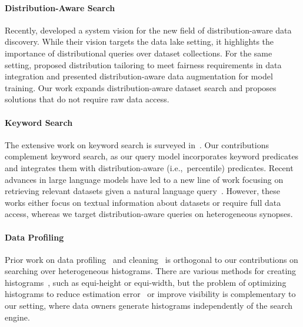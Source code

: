 \paragraph{Distribution-Aware Search}
Recently, \textcite{asudeh_towards_2022} developed a system vision for the new field of distribution-aware data discovery.
While their vision targets the data lake setting, it highlights the importance of distributional queries over dataset collections.
For the same setting, \textcite{nargesian_tailoring_2021} proposed distribution tailoring to meet fairness requirements in data integration and \textcite{chai_selective_2022} presented distribution-aware data augmentation for model training.
Our work expands distribution-aware dataset search and proposes solutions that do not require raw data access.

\paragraph{Keyword Search}
The extensive work on keyword search is surveyed in~\cite{le_survey_2016, park_keyword_2011, yang_keyword_2021, yu_keyword_2010}.
Our contributions complement keyword search, as our query model incorporates keyword predicates and integrates them with distribution-aware (i.e.,~percentile) predicates.
Recent advances in large language models have led to a new line of work focusing on retrieving relevant datasets given a natural language query~\cite{herzig_open_2021, wang_retrieving_2021, wang_solo_2023}.
However, these works either focus on textual information about datasets or require full data access, whereas we target distribution-aware queries on heterogeneous synopses.

\paragraph{Data Profiling}
Prior work on data profiling~\cite{abedjan_profiling_2015} and cleaning~\cite{abedjan_detecting_2016, halevy_goods_2016, galhotra_dataprism_2022} is orthogonal to our contributions on searching over heterogeneous histograms.
There are various methods for creating histograms~\cite{cormode_synopses_2011}, such as equi-height or equi-width, but the problem of optimizing histograms to reduce estimation error~\cite{behar_optimal_2020, jagadish_optimal_1998} or improve visibility is complementary to our setting, where data owners generate histograms independently of the search engine.
